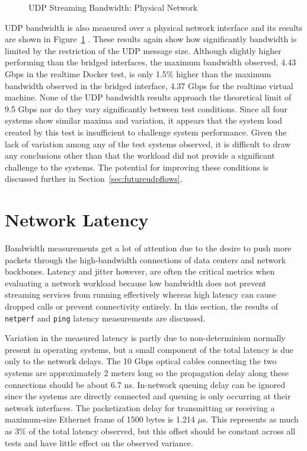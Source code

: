 \begin{figure}
    \centering
    \def\svgwidth{\columnwidth}
    
    \caption{UDP Streaming Bandwidth: Physical Network}
    \label{fig:udp_stream_phys}
\end{figure}

UDP bandwidth is also measured over a physical network interface and its results are shown in Figure~\ref{fig:udp_stream_phys} .  
These results again show how significantly bandwidth is limited by the restriction of the UDP message size.
Although slightly higher performing than the bridged interfaces, the maximum bandwidth observed, 4.43 Gbps in the realtime Docker test, is only 1.5\% higher than the maximum bandwidth observed in the bridged interface, 4.37 Gbps for the realtime virtual machine. 
None of the UDP bandwidth results approach the theoretical limit of 9.5 Gbps nor do they vary significantly between test conditions.
Since all four systems show similar maxima and variation, it appears that the system load created by this test is insufficient to challenge system performance.
Given the lack of variation among any of the test systems observed, it is difficult to draw any conclusions other than that the workload did not provide a significant challenge to the systems.
The potential for improving these conditions is discussed further in Section~\ref{sec:futureudpflows}.



\section{Network Latency} %
\label{sec:networklatency}
Bandwidth measurements get a lot of attention due to the desire to push more packets through the high-bandwidth connections of data centers and network backbones.
Latency and jitter however, are often the critical metrics when evaluating a network workload because low bandwidth does not prevent streaming services from running effectively whereas high latency can cause dropped calls or prevent connectivity entirely.
In this section, the results of \texttt{netperf} and \texttt{ping} latency measurements are discussed.  

Variation in the measured latency is partly due to non-determinism normally present in operating systems, but a small component of the total latency is due only to the network delays.
The 10 Gbps optical cables connecting the two systems are approximately 2 meters long so the propagation delay along these connections should be about 6.7 ns.
In-network queuing delay can be ignored since the systems are directly connected and queuing is only occurring at their network interfaces.
The packetization delay for transmitting or receiving a maximum-size Ethernet frame of 1500 bytes is 1.214 $\mu$s.
This represents as much as 3\% of the total latency observed, but this offset should be constant across all tests and have little effect on the observed variance. 


